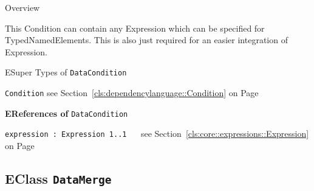 	\begin{longdescription}
		\item[Overview] 		
				

	

		This Condition can contain any Expression which can be specified for TypedNamedElements.
This is also just required for an easier integration of Expression.		
		\item[ESuper Types of \texttt{DataCondition}] ~
			\begin{longdescription}
				\item[\texttt{Condition}] see Section~\ref{cls:dependencylanguage::Condition} on Page~\pageref{cls:dependencylanguage::Condition}						\end{longdescription}
		
	
			\item[\textbf{EReferences of} \texttt{DataCondition}] ~
			\begin{longdescription}
	\item[\texttt{expression : Expression \symbol{"5B}1..1\symbol{"5D}
}] ~
	see Section~\ref{cls:core::expressions::Expression} on Page~\pageref{cls:core::expressions::Expression}
	
	\nopagebreak
		
				

	

	
			\end{longdescription}
	
	\end{longdescription}
	

\subsection{EClass \bfseries \texttt{DataMerge}\normalfont}
\label{cls:dependencylanguage::DataMerge} 
	
